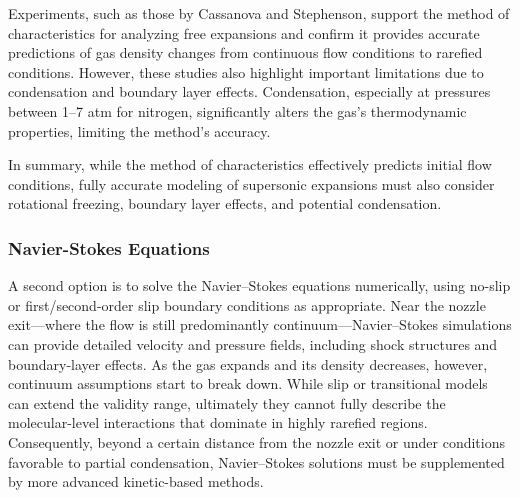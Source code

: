 		Experiments, such as those by Cassanova and Stephenson, support the method of characteristics for analyzing free expansions and confirm it provides accurate predictions of gas density changes from continuous flow conditions to rarefied conditions.
		However, these studies also highlight important limitations due to condensation and boundary layer effects.
		Condensation, especially at pressures between 1–7 atm for nitrogen, significantly alters the gas's thermodynamic properties, limiting the method's accuracy.

		In summary, while the method of characteristics effectively predicts initial flow conditions, fully accurate modeling of supersonic expansions must also consider rotational freezing, boundary layer effects, and potential condensation.
		\cite{jousten_handbook_2016, robertson_investigation_1970, noauthor_zucrow_nodate}

\subsubsection*{Navier-Stokes Equations}
	A second option is to solve the Navier–Stokes equations numerically, using no-slip or first/second-order slip boundary conditions as appropriate.
	Near the nozzle exit—where the flow is still predominantly continuum—Navier–Stokes simulations can provide detailed velocity and pressure fields, including shock structures and boundary-layer effects.
	As the gas expands and its density decreases, however, continuum assumptions start to break down.
	While slip or transitional models can extend the validity range, ultimately they cannot fully describe the molecular-level interactions that dominate in highly rarefied regions.
	Consequently, beyond a certain distance from the nozzle exit or under conditions favorable to partial condensation, Navier–Stokes solutions must be supplemented by more advanced kinetic-based methods.
	\cite{anderson_fundamentals_2017, anderson2021modern}

